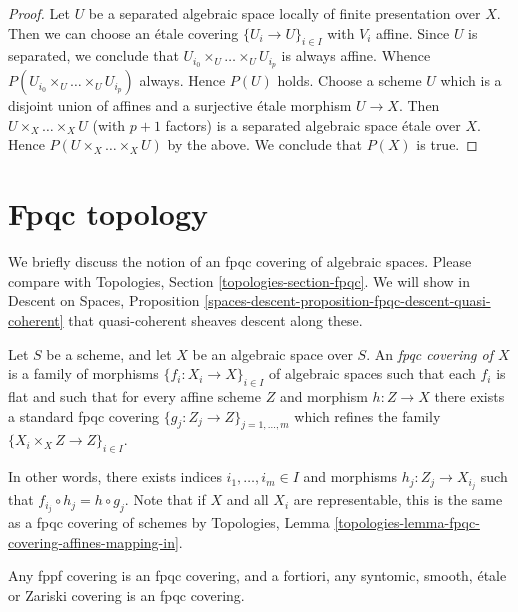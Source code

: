 \begin{proof}
Let $U$ be a separated algebraic space locally of finite presentation over $X$.
Then we can choose an \'etale covering $\{U_i \to U\}_{i \in I}$ with $V_i$
affine. Since $U$ is separated, we conclude that
$U_{i_0} \times_U \ldots \times_U U_{i_p}$ is always affine.
Whence $P(U_{i_0} \times_U \ldots \times_U U_{i_p})$ always.
Hence $P(U)$ holds. Choose a scheme $U$ which is a disjoint union of
affines and a surjective \'etale morphism $U \to X$.
Then $U \times_X \ldots \times_X U$ (with $p + 1$ factors)
is a separated algebraic space
\'etale over $X$. Hence $P(U \times_X \ldots \times_X U)$ by the above.
We conclude that $P(X)$ is true.
\end{proof}












\section{Fpqc topology}
\label{section-fpqc}

\noindent
We briefly discuss the notion of an fpqc covering of algebraic spaces.
Please compare with
Topologies, Section \ref{topologies-section-fpqc}.
We will show in
Descent on Spaces,
Proposition \ref{spaces-descent-proposition-fpqc-descent-quasi-coherent}
that quasi-coherent sheaves descent along these.

\begin{definition}
\label{definition-fpqc-covering}
Let $S$ be a scheme, and let $X$ be an algebraic space over $S$.
An {\it fpqc covering of $X$} is a family of morphisms
$\{f_i : X_i \to X\}_{i \in I}$ of algebraic spaces
such that each $f_i$ is flat and such that for every affine scheme
$Z$ and morphism $h : Z \to X$ there exists a standard fpqc covering
$\{g_j : Z_j \to Z\}_{j = 1, \ldots, m}$ which refines the family
$\{X_i \times_X Z \to Z\}_{i \in I}$.
\end{definition}

\noindent
In other words, there exists indices $i_1, \ldots, i_m \in I$ and
morphisms $h_j : Z_j \to X_{i_j}$ such that
$f_{i_j} \circ h_j = h \circ g_j$. Note that if $X$ and all $X_i$ are
representable, this is the same as a fpqc covering of schemes by
Topologies, Lemma \ref{topologies-lemma-fpqc-covering-affines-mapping-in}.

\begin{lemma}
\label{lemma-zariski-etale-smooth-syntomic-fppf-fpqc}
Any fppf covering is an fpqc covering, and a fortiori,
any syntomic, smooth, \'etale or Zariski covering is an fpqc covering.
\end{lemma}

